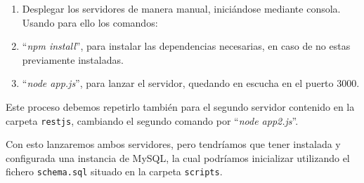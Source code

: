 \begin{enumerate}
\item Desplegar los servidores de manera manual, iniciándose mediante
  consola. Usando para ello los comandos:

\item ``\textit{npm install}'', para instalar las dependencias necesarias,
  en caso de no estas previamente instaladas.
\item ``\textit{node app.js}'', para lanzar el servidor, quedando en
  escucha en el puerto 3000.
\end{enumerate}

Este proceso debemos repetirlo también para el segundo servidor contenido
en la carpeta {\tt restjs}, cambiando el segundo comando por ``\emph{node
  app2.js}''.

Con esto lanzaremos ambos servidores, pero tendríamos que tener instalada y
configurada una instancia de MySQL, la cual podríamos inicializar
utilizando el fichero {\tt schema.sql} situado en la carpeta {\tt scripts}.


